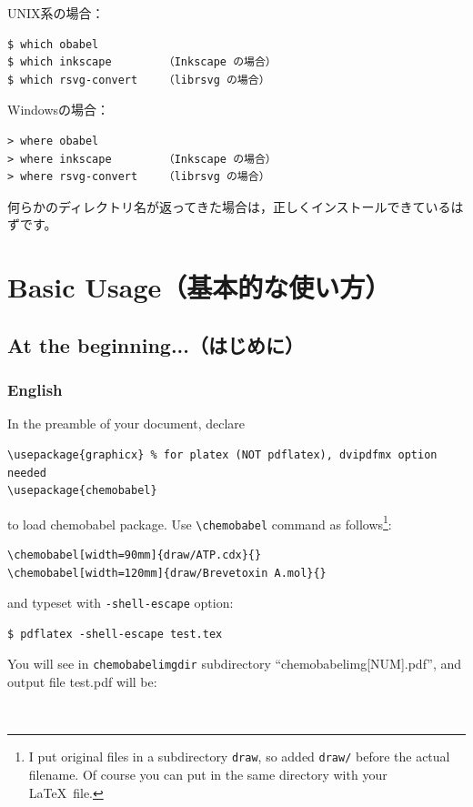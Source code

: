 \documentclass[12pt]{ltjsarticle}
\begin{document}
UNIX系の場合：
\begin{verbatim}
$ which obabel
$ which inkscape        （Inkscape の場合）
$ which rsvg-convert    （librsvg の場合）
\end{verbatim}

Windowsの場合：
\begin{verbatim}
> where obabel
> where inkscape        （Inkscape の場合）
> where rsvg-convert    （librsvg の場合）
\end{verbatim}

何らかのディレクトリ名が返ってきた場合は，正しくインストールできているはずです。

\clearpage

\section{Basic Usage（基本的な使い方）} \label{basic}

\subsection{At the beginning...（はじめに）}

\subsubsection{English}
In the preamble of your document, declare
\begin{verbatim}
\usepackage{graphicx} % for platex (NOT pdflatex), dvipdfmx option needed
\usepackage{chemobabel}
\end{verbatim}
to load \textsf{chemobabel} package.
Use \verb|\chemobabel| command as follows\footnote{I put original files
in a subdirectory \texttt{draw}, so added \texttt{draw/} before the actual
filename. Of course you can put in the same directory with your \LaTeX\ file.}:
\begin{verbatim}
\chemobabel[width=90mm]{draw/ATP.cdx}{}
\chemobabel[width=120mm]{draw/Brevetoxin A.mol}{}
\end{verbatim}
and typeset with \verb|-shell-escape| option:
\begin{verbatim}
$ pdflatex -shell-escape test.tex
\end{verbatim}
You will see in \verb|chemobabelimgdir| subdirectory ``chemobabelimg[NUM].pdf'',
and output file test.pdf will be:
\begin{figure}[h]
  \centering
   \\ \vspace{1cm}
\end{figure}
\end{document}
